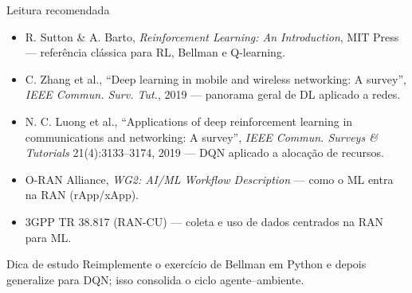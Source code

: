 \documentclass[aspectratio=169,11pt]{beamer}
\begin{document}
\begin{frame}{Leitura recomendada}
  \begin{itemize}
    \item R. Sutton \& A. Barto, \emph{Reinforcement Learning: An Introduction}, MIT Press --- referência clássica para RL, Bellman e Q-learning.
    \item C. Zhang et al., ``Deep learning in mobile and wireless networking: A survey'', \emph{IEEE Commun. Surv. Tut.}, 2019 --- panorama geral de DL aplicado a redes.
    \item N. C. Luong et al., ``Applications of deep reinforcement learning in communications and networking: A survey'', \emph{IEEE Commun. Surveys \& Tutorials} 21(4):3133--3174, 2019 --- DQN aplicado a alocação de recursos.
    \item O-RAN Alliance, \emph{WG2: AI/ML Workflow Description} --- como o ML entra na RAN (rApp/xApp).
    \item 3GPP TR 38.817 (RAN-CU) --- coleta e uso de dados centrados na RAN para ML.
  \end{itemize}
  \begin{alertblock}{Dica de estudo}
    Reimplemente o exercício de Bellman em Python e depois generalize para DQN; isso consolida o ciclo agente--ambiente.
  \end{alertblock}
\end{frame}
\end{document}
